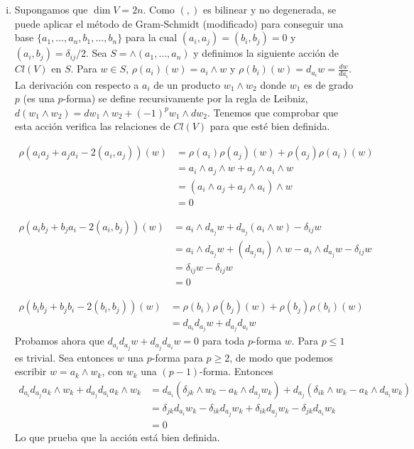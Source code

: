 \documentclass[twoside]{article}
\begin{document}
\begin{enumerate}[(i)]
\item Supongamos que $\dim V=2n$. Como $(,)$ es bilinear y no degenerada, se puede aplicar el método de Gram-Schmidt (modificado) para conseguir una base $\{a_1,\dots, a_n,b_1,\dots, b_n\}$ para la cual $(a_i,a_j)=(b_i,b_j)=0$ y $(a_i,b_j)=\delta_{ij}/2$. Sea $S=\land (a_1,\dots, a_n)$ y definimos la siguiente acción de $Cl(V)$ en $S$. Para $w\in S$, $\rho(a_i)(w)=a_i\land w$ y $\rho(b_i)(w)=d_{a_i}w=\frac{dw}{da_i}$. La derivación con respecto a $a_i$ de un producto $w_1\land w_2$ donde $w_1$ es de grado $p$ (es una $p$-forma) se define recursivamente por la regla de Leibniz, $d(w_1\land w_2)=dw_1\land w_2+(-1)^pw_1\land dw_2$. Tenemos que comprobar que esta acción verifica las relaciones de $Cl(V)$ para que esté bien definida.

\begin{align*}
\rho(a_i a_j + a_j a_i - 2( a_i, a_j))(w)
&= \rho(a_i)\rho(a_j)(w) + \rho(a_j)\rho(a_i)(w) \\
&= a_i \wedge a_j \wedge w + a_j \wedge a_i \wedge w \\
&= (a_i \wedge a_j + a_j \wedge a_i) \wedge w \\
&=0
\end{align*}

\begin{align*}
\rho(a_i b_j + b_j a_i - 2( a_i, b_j))(w)
&= a_i \wedge d_{a_j}w + d_{a_j}(a_i \wedge w) -
\delta_{ij}w \\
&= a_i \wedge d_{a_j}w + (d_{a_j}a_i) \wedge w -
a_i \wedge d_{a_j}w - \delta_{ij}w\\
&= \delta_{ij}w - \delta_{ij}w \\
&= 0
\end{align*}

\begin{align*}
\rho(b_i b_j + b_j b_i - 2( b_i, b_j))(w)
&= \rho(b_i)\rho(b_j)(w) + \rho(b_j)\rho(b_i)(w) \\
&= d_{a_i} d_{a_j}w + d_{a_j} d_{a_i}w 
\end{align*}
Probamos ahora que $d_{a_i} d_{a_j}w + d_{a_j} d_{a_i}w=0$ para toda $p$-forma $w$. Para $p\leq 1$ es trivial. Sea entonces $w$ una $p$-forma para $p\geq 2$, de modo que podemos escribir $w=a_k\land w_k$, con $w_k$ una $(p-1)$-forma. Entonces
\begin{align*}
d_{a_i}d_{a_j}a_k\land w_k+d_{a_j}d_{a_i}a_k\land w_k&=d_{a_i}(\delta_{jk}\land w_k-a_k\land d_{a_j}w_k)+d_{a_j}(\delta_{ik}\land w_k-a_k\land d_{a_i}w_k)\\
&=\delta_{jk} d_{a_i}w_k-\delta_{ik} d_{a_j}w_k+\delta_{ik}d_{a_j}w_k-\delta_{jk}d_{a_i}w_k\\
&=0
\end{align*}
Lo que prueba que la acción está bien definida.


\end{enumerate}
\end{document}
